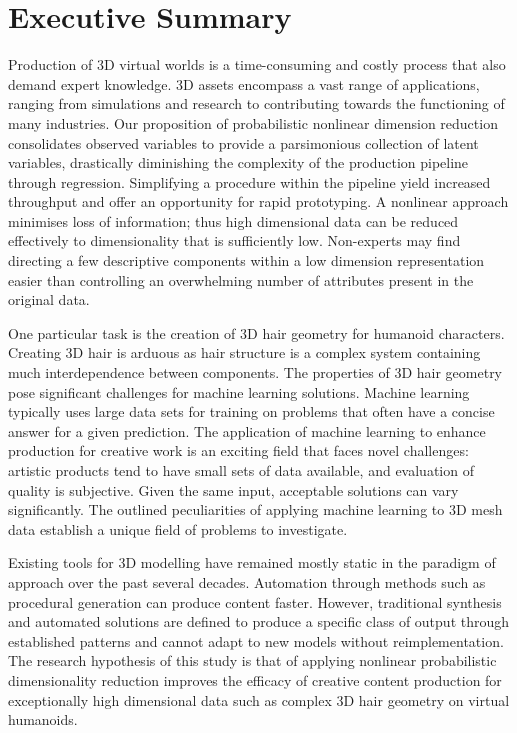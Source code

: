 \documentclass[ %
author={Dillon Keith Diep},
supervisor={Dr. Carl Henrik Ek},
degree={MEng},
title={ART-CG Hair:},
subtitle={Assisted Real-time Content Generation of Stylised Virtual Hair},
type={Research},
year={2017} ]{dissertation}
\begin{document}
\chapter*{Executive Summary}
Production of 3D virtual worlds is a time-consuming and costly process that also demand expert knowledge. 3D assets encompass a vast range of applications, ranging from simulations and research to contributing towards the functioning of many industries. Our proposition of probabilistic nonlinear dimension reduction consolidates observed variables to provide a parsimonious collection of latent variables, drastically diminishing the complexity of the production pipeline through regression. Simplifying a procedure within the pipeline yield increased throughput and offer an opportunity for rapid prototyping. A nonlinear approach minimises loss of information; thus high dimensional data can be reduced effectively to dimensionality that is sufficiently low. Non-experts may find directing a few descriptive components within a low dimension representation easier than controlling an overwhelming number of attributes present in the original data.

One particular task is the creation of 3D hair geometry for humanoid characters. Creating 3D hair is arduous as hair structure is a complex system containing much interdependence between components. The properties of 3D hair geometry pose significant challenges for machine learning solutions. Machine learning typically uses large data sets for training on problems that often have a concise answer for a given prediction. The application of machine learning to enhance production for creative work is an exciting field that faces novel challenges: artistic products tend to have small sets of data available, and evaluation of quality is subjective. Given the same input, acceptable solutions can vary significantly. The outlined peculiarities of applying machine learning to 3D mesh data establish a unique field of problems to investigate.

Existing tools for 3D modelling have remained mostly static in the paradigm of approach over the past several decades. Automation through methods such as procedural generation can produce content faster. However, traditional synthesis and automated solutions are defined to produce a specific class of output through established patterns and cannot adapt to new models without reimplementation. The research hypothesis of this study is that of applying nonlinear probabilistic dimensionality reduction improves the efficacy of creative content production for exceptionally high dimensional data such as complex 3D hair geometry on virtual humanoids.
\end{document}
